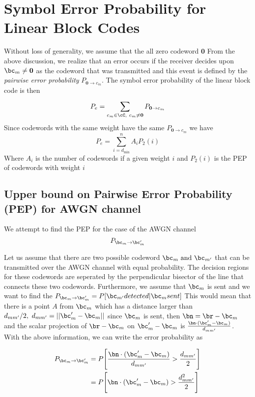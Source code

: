 \documentclass[11pt, oneside, dvipdfmx]{book}
\begin{document}
\section{Symbol Error Probability for Linear Block Codes}
Without loss of generality, we assume that the all zero codeword $\mathbf{0}$
From the above discussion, we realize that an error occurs if the receiver decides upon $\bc_m \neq \mathbf{0} $ as the codeword that was transmitted and this event is defined by the \textit{pairwise error probability} $P_{\mathbf{0} \rightarrow c_m}$. The symbol error probability of the linear block code is then 
\begin{equation}
P_e = \sum_{c_m \in \cC,~c_{m} \neq \mathbf{0}}^{} P_{\mathbf{0} \rightarrow c_m}
\end{equation}
Since codewords with the same weight have the same $P_{\mathbf{0} \rightarrow c_m}$ we have 
\begin{equation}
P_e = \sum_{i=d_{\text{min}}}^{n} A_iP_{2}(i)
\end{equation}
Where $A_i$ is the number of codewords if a given weight $i$ and $P_2(i)$ is the PEP of codewords with weight $i$ 

\subsection{Upper bound on Pairwise Error Probability (PEP) for AWGN channel}
We attempt to find the PEP for the case of the AWGN channel  
\begin{equation}
P_{\bc_m \rightarrow \bc_m'}
\end{equation}

Let us assume that there are two possible codeword $\bc_m ~\text{and}~ \bc_{m'}$ that can be transmitted over the AWGN channel with equal probability. The decision regions for these codewords are seperated by the perpendicular bisector of the line that connects these two codewords. Furthermore, we assume that $\bc_m$ is sent and we want to find the $P_{\bc_m \rightarrow \bc_m'} = P[\bc_{m'} detected|\bc_m sent]$
This would mean that there is a point $A$ from $\bc_m$ which has a distance larger than $d_{mm'}/2,~d_{mm'}=||\bc_m'-\bc_m||$ since $\bc_m$ is sent, then $\bn=\br-\bc_m$ and the scalar projection of $\br-\bc_m$ on $\bc_m'-\bc_m$ is $\frac{\bn \cdot (\bc_m'-\bc_m)}{d_{mm'}}$. With the above information, we can write the error probability as

\begin{equation}
\begin{split}
P_{\bc_m \rightarrow \bc_m'}&=P\Bigg[\frac{\bn \cdot (\bc_m'-\bc_m)}{d_{mm'}} > \frac{d_{mm'}}{2}\Bigg]\\
&=P\Bigg[\bn \cdot (\bc_m'-\bc_m) > \frac{d_{mm'}^2}{2}\Bigg]\\
\end{split}
\end{equation}
\end{document}
